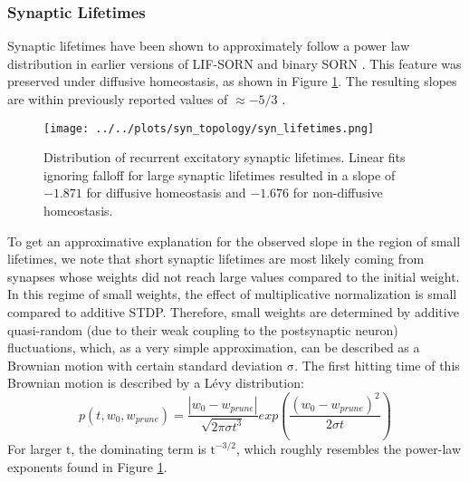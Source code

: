 \documentclass[10pt,a4paper]{article}
\begin{document}
\subsubsection{Synaptic Lifetimes}
Synaptic lifetimes have been shown to approximately follow a power law distribution in earlier versions of LIF-SORN and binary SORN \cite{SORN_Paper,Pengsheng_2013}. This feature was preserved under diffusive homeostasis, as shown in Figure \ref{Syn_Lifetimes}. The resulting slopes are within previously reported values of $\mathrm{\approx - 5/3}$ \cite{SORN_Paper}.
\begin{figure}
\texttt{[image: ../../plots/syn\_topology/syn\_lifetimes.png]}
\caption{Distribution of recurrent excitatory synaptic lifetimes. Linear fits ignoring falloff for large synaptic lifetimes resulted in a slope of $\mathrm{-1.871}$ for diffusive homeostasis and $\mathrm{-1.676}$ for non-diffusive homeostasis.}
\label{Syn_Lifetimes}
\end{figure}
To get an approximative explanation for the observed slope in the region of small lifetimes, we note that short synaptic lifetimes are most likely coming from synapses whose weights did not reach large values compared to the initial weight. In this regime of small weights, the effect of multiplicative normalization is small compared to additive STDP. Therefore, small weights are determined by additive quasi-random (due to their weak coupling to the postsynaptic neuron) fluctuations, which, as a very simple approximation, can be described as a Brownian motion with certain standard deviation $\mathrm{\sigma}$. The first hitting time of this Brownian motion is described by a Lévy distribution:
\begin{equation}
p(t,w_0,w_{prune}) = \frac{|w_0-w_{prune}|}{\sqrt{2\pi \sigma t^3}}exp \left( \frac{(w_0-w_{prune})^2}{2\sigma t}\right)
\label{Levy_Dist}
\end{equation}
For larger $\mathrm{t}$, the dominating term is $\mathrm{t^{-3/2}}$, which roughly resembles the power-law exponents found in Figure \ref{Syn_Lifetimes}.
\end{document}

